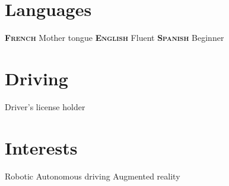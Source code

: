 \documentclass[]{friggeri-cv-cust}
\begin{document}
\begin{asidep2}
  \section{Languages}
    \textbf{\textsc{French}}
    Mother tongue
    \textbf{\textsc{English}}
    Fluent
    \textbf{\textsc{Spanish}}
    Beginner  
  \section{Driving}
    Driver's license holder
  \section{Interests}
  Robotic
  Autonomous driving    
  Augmented reality  
\end{asidep2}
\end{document}
